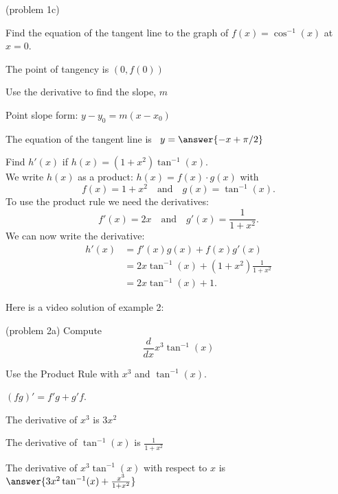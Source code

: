 \documentclass[handout]{ximera}
\begin{document}
\begin{problem}(problem 1c)

Find the equation of the tangent line to the graph of $f(x) = \cos^{-1}(x)$ at $x=0.$

\begin{hint}
The point of tangency is $(0, f(0))$
\end{hint}
\begin{hint}
Use the derivative to find the slope, $m$
\end{hint}
\begin{hint}
Point slope form: $y-y_0 = m(x-x_0)$
\end{hint}

The equation of the tangent line is \ $y = \answer{-x + \pi/2}$

\end{problem}


\begin{example}[example 2]
Find $h'(x)$ if $h(x) = (1+x^2)\tan^{-1}(x)$.\\
We write $h(x)$ as a product: $h(x) = f(x)\cdot g(x)$ with
\[f(x) = 1+x^2 \quad \text{and} \quad g(x) = \tan^{-1}(x).\]
To use the product rule we need the derivatives:
\[f'(x) = 2x \quad \text{and} \quad g'(x) = \frac{1}{1+x^2}.\]
We can now write the derivative:
\begin{align*}
h'(x) &= f'(x)g(x) + f(x)g'(x) \\
&= 2x\tan^{-1}(x)  + (1+x^2)\frac{1}{1+x^2} \\
&=  2x\tan^{-1}(x) + 1.
\end{align*}
\end{example}


Here is a video solution of example 2:
\begin{foldable}
\end{foldable}




\begin{problem}(problem 2a)
  Compute
  \[
  \frac{d}{dx} x^3 \tan^{-1}(x)
  \]
  
    \begin{hint}
      Use the Product Rule with $x^3$ and $\tan^{-1}(x)$.
    \end{hint}
    \begin{hint}
      $(fg)' = f'g+g'f$.
    \end{hint}
    \begin{hint}
      The derivative of $x^3$ is $3x^2$
    \end{hint}
    \begin{hint}
      The derivative of $\tan^{-1}(x)$ is $\frac{1}{1+x^2}$
    \end{hint}
		The derivative of $x^3\tan^{-1}(x)$ with respect to $x$ is
		 $\answer{3x^2 \tan^{-1}(x) + \frac{x^3}{1+x^2}}$
		
\end{problem}
\end{document}
